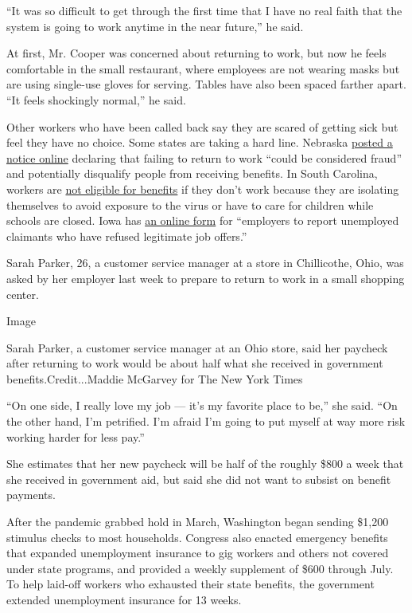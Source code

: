 ``It was so difficult to get through the first time that I have no real
faith that the system is going to work anytime in the near future,'' he
said.

At first, Mr. Cooper was concerned about returning to work, but now he
feels comfortable in the small restaurant, where employees are not
wearing masks but are using single-use gloves for serving. Tables have
also been spaced farther apart. ``It feels shockingly normal,'' he said.

Other workers who have been called back say they are scared of getting
sick but feel they have no choice. Some states are taking a hard line.
Nebraska \href{https://dol.nebraska.gov/PressRelease/Details/153}{posted
a notice online} declaring that failing to return to work ``could be
considered fraud'' and potentially disqualify people from receiving
benefits. In South Carolina, workers are
\href{https://dew.sc.gov/docs/default-source/default-document-library/covid-19-related-ui-information.pdf?sfvrsn=133a12f0_0}{not
eligible for benefits} if they don't work because they are isolating
themselves to avoid exposure to the virus or have to care for children
while schools are closed. Iowa has
\href{https://www.iowaworkforcedevelopment.gov/job-offer-decline-form-employers}{an
online form} for ``employers to report unemployed claimants who have
refused legitimate job offers.''

Sarah Parker, 26, a customer service manager at a store in Chillicothe,
Ohio, was asked by her employer last week to prepare to return to work
in a small shopping center.

Image

Sarah Parker, a customer service manager at an Ohio store, said her
paycheck after returning to work would be about half what she received
in government benefits.Credit...Maddie McGarvey for The New York Times

``On one side, I really love my job --- it's my favorite place to be,''
she said. ``On the other hand, I'm petrified. I'm afraid I'm going to
put myself at way more risk working harder for less pay.''

She estimates that her new paycheck will be half of the roughly \$800 a
week that she received in government aid, but said she did not want to
subsist on benefit payments.

After the pandemic grabbed hold in March, Washington began sending
\$1,200 stimulus checks to most households. Congress also enacted
emergency benefits that expanded unemployment insurance to gig workers
and others not covered under state programs, and provided a weekly
supplement of \$600 through July. To help laid-off workers who exhausted
their state benefits, the government extended unemployment insurance for
13 weeks.

